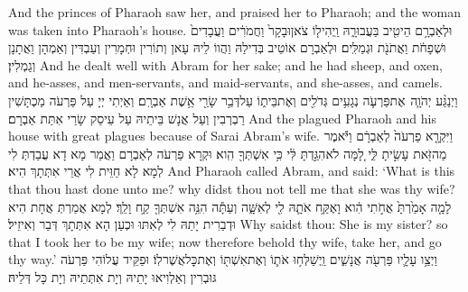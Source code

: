 {And the princes of Pharaoh saw her, and praised her to Pharaoh; and the woman was taken into Pharaoh’s house.}{}
{וּלְאַבְרָ֥ם הֵיטִ֖יב בַּעֲבוּרָ֑הּ וַֽיְהִי\maqqaf ל֤וֹ צֹאן\maqqaf וּבָקָר֙ וַחֲמֹרִ֔ים וַעֲבָדִים֙ וּשְׁפָחֹ֔ת וַאֲתֹנֹ֖ת וּגְמַלִּֽים׃}
{וּלְאַבְרָם אוֹטֵיב בְּדִילַהּ וַהֲווֹ לֵיהּ עָאן וְתוֹרִין וּחְמָרִין וְעַבְדִּין וְאַמְהָן וַאֲתָנָן וְגַמְלִין׃}
{And he dealt well with Abram for her sake; and he had sheep, and oxen, and he-asses, and men-servants, and maid-servants, and she-asses, and camels.}{}
{וַיְנַגַּ֨ע יְהֹוָ֧ה \pasek  אֶת\maqqaf פַּרְעֹ֛ה נְגָעִ֥ים גְּדֹלִ֖ים וְאֶת\maqqaf בֵּית֑וֹ עַל\maqqaf דְּבַ֥ר שָׂרַ֖י אֵ֥שֶׁת אַבְרָֽם׃}
{וְאַיְתִי יְיָ עַל פַּרְעֹה מַכְתָּשִׁין רַבְרְבִין וְעַל אֲנָשׁ בֵּיתֵיהּ עַל עֵיסַק שָׂרַי אִתַּת אַבְרָם׃}
{And the \lord\space plagued Pharaoh and his house with great plagues because of Sarai Abram’s wife.}{}
{וַיִּקְרָ֤א פַרְעֹה֙ לְאַבְרָ֔ם וַיֹּ֕אמֶר מַה\maqqaf זֹּ֖את עָשִׂ֣יתָ לִּ֑י לָ֚מָּה לֹא\maqqaf הִגַּ֣דְתָּ לִּ֔י כִּ֥י אִשְׁתְּךָ֖ הִֽוא׃}
{וּקְרָא פַרְעֹה לְאַבְרָם וַאֲמַר מָא דָא עֲבַדְתְּ לִי לְמָא לָא חַוֵּית לִי אֲרֵי אִתְּתָךְ הִיא׃}
{And Pharaoh called Abram, and said: ‘What is this that thou hast done unto me? why didst thou not tell me that she was thy wife?}{}
{לָמָ֤ה אָמַ֙רְתָּ֙ אֲחֹ֣תִי הִ֔וא וָאֶקַּ֥ח אֹתָ֛הּ לִ֖י לְאִשָּׁ֑ה וְעַתָּ֕ה הִנֵּ֥ה אִשְׁתְּךָ֖ קַ֥ח וָלֵֽךְ׃}
{לְמָא אֲמַרְתְּ אֲחָת הִיא וּדְבַרִית יָתַהּ לִי לְאִתּוּ וּכְעַן הָא אִתְּתָךְ דְּבַר וְאִיזֵיל׃}
{Why saidst thou: She is my sister? so that I took her to be my wife; now therefore behold thy wife, take her, and go thy way.’}{}
{וַיְצַ֥ו עָלָ֛יו פַּרְעֹ֖ה אֲנָשִׁ֑ים וַֽיְשַׁלְּח֥וּ אֹת֛וֹ וְאֶת\maqqaf אִשְׁתּ֖וֹ וְאֶת\maqqaf כׇּל\maqqaf אֲשֶׁר\maqqaf לֽוֹ׃}
{וּפַקֵּיד עֲלוֹהִי פַּרְעֹה גּוּבְרִין וְאַלְוִיאוּ יָתֵיהּ וְיָת אִתְּתֵיהּ וְיָת כָּל דְּלֵיהּ׃}
